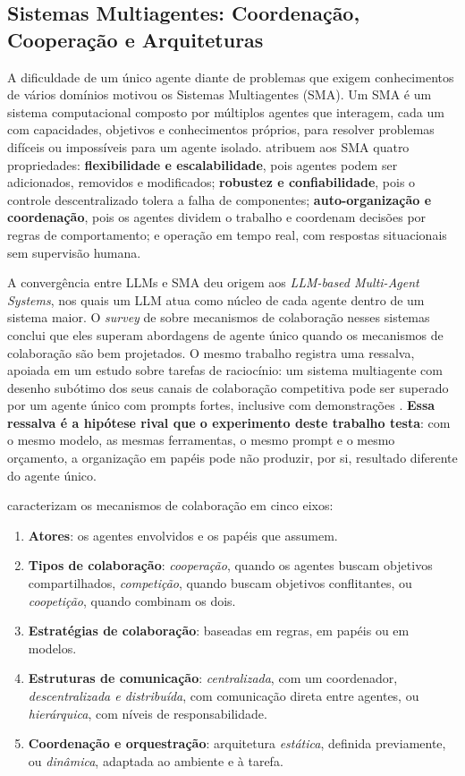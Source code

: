 \subsection{Sistemas Multiagentes: Coordenação, Cooperação e Arquiteturas}
\label{ssec:sma}

A dificuldade de um único agente diante de problemas que exigem conhecimentos de vários domínios motivou os Sistemas Multiagentes (SMA). Um SMA é um sistema computacional composto por múltiplos agentes que interagem, cada um com capacidades, objetivos e conhecimentos próprios, para resolver problemas difíceis ou impossíveis para um agente isolado. \cite{SurveyLLMs2025} atribuem aos SMA quatro propriedades: \textbf{flexibilidade e escalabilidade}, pois agentes podem ser adicionados, removidos e modificados; \textbf{robustez e confiabilidade}, pois o controle descentralizado tolera a falha de componentes; \textbf{auto-organização e coordenação}, pois os agentes dividem o trabalho e coordenam decisões por regras de comportamento; e operação em tempo real, com respostas situacionais sem supervisão humana.

A convergência entre LLMs e SMA deu origem aos \textit{LLM-based Multi-Agent Systems}, nos quais um LLM atua como núcleo de cada agente dentro de um sistema maior. O \textit{survey} de \cite{SurveyLLMs2025} sobre mecanismos de colaboração nesses sistemas conclui que eles superam abordagens de agente único quando os mecanismos de colaboração são bem projetados. O mesmo trabalho registra uma ressalva, apoiada em um estudo sobre tarefas de raciocínio: um sistema multiagente com desenho subótimo dos seus canais de colaboração competitiva pode ser superado por um agente único com prompts fortes, inclusive com demonstrações \citep{SurveyLLMs2025}. \textbf{Essa ressalva é a hipótese rival que o experimento deste trabalho testa}: com o mesmo modelo, as mesmas ferramentas, o mesmo prompt e o mesmo orçamento, a organização em papéis pode não produzir, por si, resultado diferente do agente único.

\cite{SurveyLLMs2025} caracterizam os mecanismos de colaboração em cinco eixos:
\begin{enumerate}
    \item \textbf{Atores}: os agentes envolvidos e os papéis que assumem.
    \item \textbf{Tipos de colaboração}: \textit{cooperação}, quando os agentes buscam objetivos compartilhados, \textit{competição}, quando buscam objetivos conflitantes, ou \textit{coopetição}, quando combinam os dois.
    \item \textbf{Estratégias de colaboração}: baseadas em regras, em papéis ou em modelos.
    \item \textbf{Estruturas de comunicação}: \textit{centralizada}, com um coordenador, \textit{descentralizada e distribuída}, com comunicação direta entre agentes, ou \textit{hierárquica}, com níveis de responsabilidade.
    \item \textbf{Coordenação e orquestração}: arquitetura \textit{estática}, definida previamente, ou \textit{dinâmica}, adaptada ao ambiente e à tarefa.
\end{enumerate}

